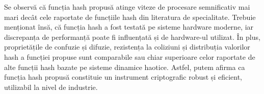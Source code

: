 Se observă că funcția hash propusă atinge viteze de procesare semnificativ mai mari decât cele raportate de funcțiile hash din literatura de specialitate.
Trebuie menționat însă, că funcția hash a fost testată pe sisteme hardware moderne, iar discrepanța de performanță poate fi influențată și de hardware-ul utilizat.
În plus, proprietățile de confuzie și difuzie, rezistența la coliziuni și distribuția valorilor hash a funcției propuse sunt comparabile sau chiar superioare celor raportate de alte funcții hash bazate pe sisteme dinamice haotice.
Astfel, putem afirma ca funcția hash propusă constituie un instrument criptografic robust și eficient, utilizabil la nivel de industrie.